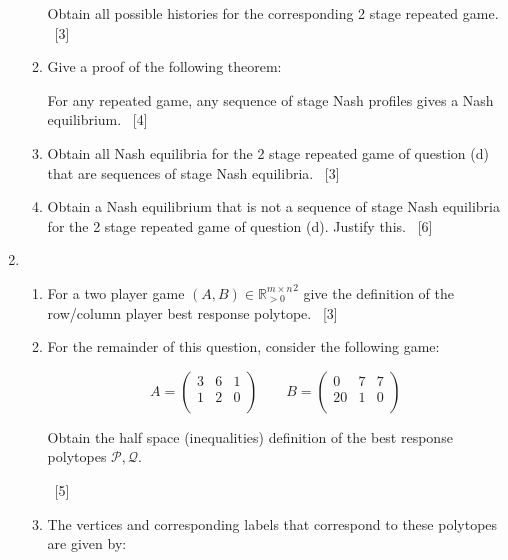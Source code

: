 \documentclass[12pt,a4paper]{article}
\begin{document}
\begin{enumerate}
\begin{enumerate}
            Obtain all possible histories for the corresponding 2 stage repeated
            game.
            ~\hfill{[3]}


        \item Give a proof of the following theorem:

            For any repeated game, any sequence of stage Nash profiles gives a
            Nash equilibrium.
            ~\hfill{[4]}

        \item Obtain all Nash equilibria for the 2 stage repeated game of
            question (d)
            that are sequences
            of stage Nash equilibria.
            ~\hfill{[3]}

        \item Obtain a Nash equilibrium that is not a sequence of stage Nash
            equilibria for the 2 stage repeated game of question (d). Justify
            this.
            ~\hfill{[6]}


    \end{enumerate}

\newpage
\item

    \begin{enumerate}
        \item For a two player game $(A, B)\in{\mathbb{R}^{m\times n}_{>0}}^2$
            give the definition of the row/column player best response polytope.
            ~\hfill{[3]}
        \item For the remainder of this question, consider the following 
            game:

            \[
                A = \begin{pmatrix}
                    3 & 6 & 1\\
                    1 & 2 & 0\\
                    \end{pmatrix}
                \qquad
                B = \begin{pmatrix}
                    0 & 7 & 7\\
                   20 & 1 & 0\\
                    \end{pmatrix}
            \]

            Obtain the half space (inequalities) definition of the best
            response polytopes \(\mathcal{P},\mathcal{Q}\).

            ~\hfill{[5]}
         \item The vertices and corresponding labels that correspond to these
             polytopes are given by:


\end{enumerate}
\end{enumerate}
\end{document}
